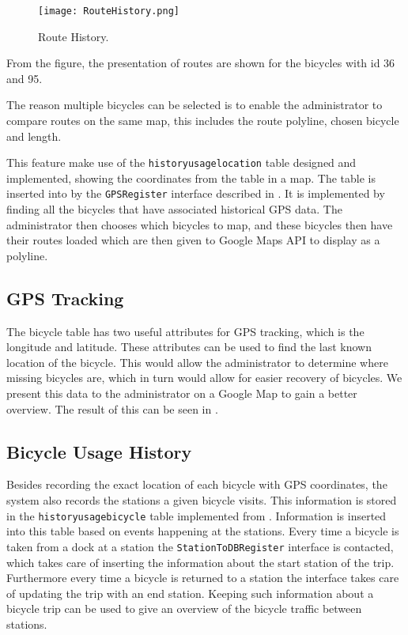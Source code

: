 \begin{figure}[H]
	\centering
	\texttt{[image: RouteHistory.png]}
	\caption{Route History.}
	\label{fig:routehistory}
\end{figure}

From the figure, the presentation of routes are shown for the bicycles with id 36 and 95.

The reason multiple bicycles can be selected is to enable the administrator to compare routes on the same map, this includes the route polyline, chosen bicycle and length.

This feature make use of the \texttt{historyusagelocation} table designed and implemented, showing the coordinates from the table in a map.
The table is inserted into by the \texttt{GPSRegister} interface described in .
It is implemented by finding all the bicycles that have associated historical GPS data.
The administrator then chooses which bicycles to map, and these bicycles then have their routes loaded which are then given to Google Maps API to display as a polyline.

\subsection{GPS Tracking}\label{sec:gpsHistory}
The bicycle table has two useful attributes for GPS tracking, which is the longitude and latitude.
These attributes can be used to find the last known location of the bicycle. 
This would allow the administrator to determine where missing bicycles are, which in turn would allow for easier recovery of bicycles.
We present this data to the administrator on a Google Map to gain a better overview.
The result of this can be seen in .

\subsection{Bicycle Usage History}\label{sec:bicycleUsageHistory}

Besides recording the exact location of each bicycle with GPS coordinates, the system also records the stations a given bicycle visits.
This information is stored in the \texttt{historyusage\-bicycle} table implemented from .
Information is inserted into this table based on events happening at the stations. 
Every time a bicycle is taken from a dock at a station the \texttt{StationTo\-DBRegister} interface is contacted, which takes care of inserting the information about the start station of the trip.
Furthermore every time a bicycle is returned to a station the interface takes care of updating the trip with an end station.
Keeping such information about a bicycle trip can be used to give an overview of the bicycle traffic between stations.

